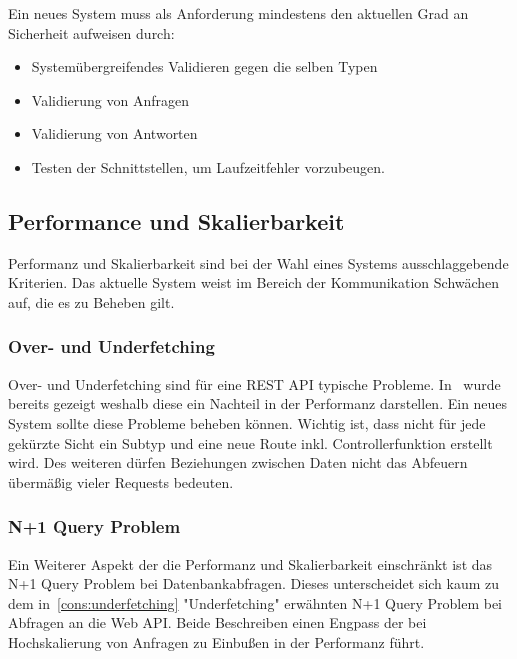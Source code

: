 Ein neues System muss als Anforderung mindestens den aktuellen Grad an Sicherheit aufweisen durch:

\begin{itemize}
    \setlength\itemsep{-1em}
    \item Systemübergreifendes Validieren gegen die selben Typen
    \item Validierung von Anfragen
    \item Validierung von Antworten
    \item Testen der Schnittstellen, um Laufzeitfehler vorzubeugen.
\end{itemize}


\subsection{Performance und Skalierbarkeit}
Performanz und Skalierbarkeit sind bei der Wahl eines Systems ausschlaggebende Kriterien. Das aktuelle System weist im Bereich der Kommunikation Schwächen auf, die es zu Beheben gilt.

\subsubsection{Over- und Underfetching}
Over- und Underfetching sind für eine REST API typische Probleme.
In~ wurde bereits gezeigt weshalb diese ein Nachteil in der Performanz darstellen.
Ein neues System sollte diese Probleme beheben können.
Wichtig ist, dass nicht für jede gekürzte Sicht ein Subtyp und eine neue Route inkl. Controllerfunktion erstellt wird. Des weiteren dürfen Beziehungen zwischen Daten nicht das Abfeuern übermäßig vieler Requests bedeuten.

\subsubsection{N+1 Query Problem}
Ein Weiterer Aspekt der die Performanz und Skalierbarkeit einschränkt ist das N+1 Query Problem bei Datenbankabfragen. Dieses unterscheidet sich kaum zu dem in~\ref{cons:underfetching} "Underfetching" erwähnten N+1 Query Problem bei Abfragen an die Web API. Beide Beschreiben einen Engpass der bei Hochskalierung von Anfragen zu Einbußen in der Performanz führt. 

